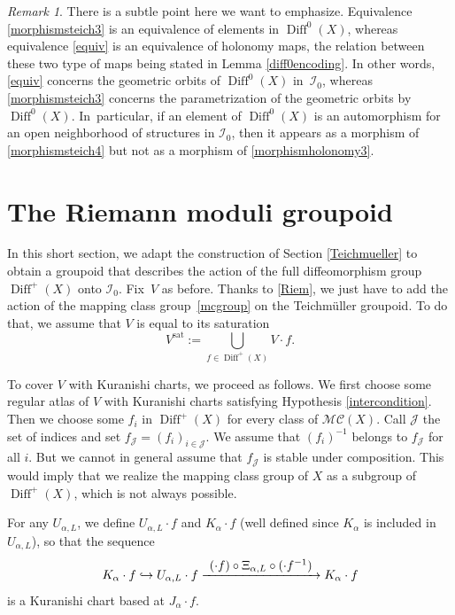 \documentclass[JEP,XML,SOM,Unicode]{cedram}
\let\mathcal\mathscr
\def\hto{\mathrel{\lhook\joinrel\to}}
\def\To#1{\mathchoice{\xrightarrow{\textstyle\kern4pt#1\kern3pt}}{\stackrel{#1}{\longrightarrow}}{}{}}
\newcommand{\sat}{\mathrm{sat}}
\DeclareMathOperator{\Diff}{Diff}
\theoremstyle{plain}
\theoremstyle{definition}
\theoremstyle{remark}
\newtheorem{remark}[theorem]{Remark}
\numberwithin{equation}{section}
\newcommand{\cI}{\mathcal{I}}
\begin{document}
\begin{remark}
\label{subtle}
There is a subtle point here we want to emphasize. Equivalence \eqref{morphismsteich3} is an equivalence of elements in $\Diff^0(X)$, whereas equivalence \eqref{equiv} is an equivalence of holonomy maps, the relation between these two type of maps \hbox{being} stated in Lemma \ref{diff0encoding}. In other words, \eqref{equiv} concerns the geometric orbits of $\Diff^0(X)$ in~$\cI_0$, whereas \eqref{morphismsteich3} concerns the parametrization of the geometric orbits by $\Diff^0(X)$. In~particular, if an element
of $\Diff^0(X)$ is an automorphism for an open neighborhood of structures in $\cI_0$, then it appears as a morphism of \eqref{morphismsteich4} but not as a morphism of \eqref{morphismholonomy3}.
\end{remark}

\section{The Riemann moduli groupoid}
\label{Riemann}

In this short section, we adapt the construction of Section \ref{Teichmueller} to obtain a groupoid that describes the action of the full diffeomorphism group $\Diff^+(X)$ onto $\cI_0$. Fix~$V$ as before. Thanks to \eqref{Riem}, we just have to add the action of the mapping class group~\eqref{mcgroup} on the Teichmüller groupoid. To do that, we assume that $V$ is equal to its saturation
\begin{equation}
\label{sat2}
V^{\sat}:=\bigcup_{f\in\Diff^+(X)}V\cdot f.
\end{equation}

To cover $V$ with Kuranishi charts, we proceed as follows. We first choose some regular atlas of $V$ with Kuranishi charts satisfying Hypothesis \ref{intercondition}. Then we choose some $f_i$ in $\Diff^+(X)$ for every class of $\mathcal M\mathcal C(X)$. Call $\mathcal J$ the set of indices and set $f_{\mathcal J}=(f_i)_{i\in\mathcal J}$.
We assume that $(f_i)^{-1}$ belongs to $f_{\mathcal J}$ for all $i$. But we cannot in general assume that $f_{\mathcal J}$ is stable under composition. This would imply
that we realize the mapping class group of $X$ as a subgroup of $\Diff^+(X)$, which is not always possible.

For any $U_{\alpha,L}$, we define $U_{\alpha,L}\cdot f$ and $K_\alpha\cdot f$ (well defined since $K_\alpha$ is included in~$U_{\alpha,L}$), so that the sequence
\begin{equation}
\label{faction}
K_\alpha\cdot f\hto U_{\alpha,L}\cdot f \To{(\cdot f)\circ \Xi_{\alpha,L}\circ (\cdot f^{-1})}K_{\alpha}\cdot f
\end{equation}
is a Kuranishi chart based at $J_\alpha\cdot f$.
\end{document}
